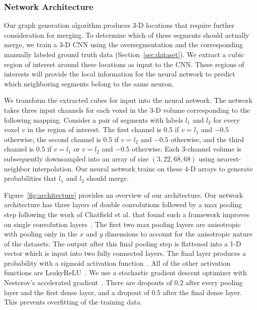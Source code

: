 \subsubsection{Network Architecture}

Our graph generation algorithm produces 3-D locations that require further consideration for merging. 
To determine which of these segments should actually merge, we train a 3-D CNN using the oversegmentation and the corresponding manually labeled ground truth data (Section~\ref{sec:dataset}).
We extract a cubic region of interest around these locations as input to the CNN. 
These regions of interests will provide the local information for the neural network to predict which neighboring segments belong to the same neuron. 

We transform the extracted cubes for input into the neural network. 
The network takes three input channels for each voxel in the 3-D volume corresponding to the following mapping. 
Consider a pair of segments with labels $l_1$ and $l_2$ for every voxel $v$ in the region of interest. 
The first channel is $0.5$ if $v = l_1$ and $-0.5$ otherwise, the second channel is $0.5$ if $v = l_2$ and $-0.5$ otherwise, and the third channel is $0.5$ if $v = l_1$ or $v = l_2$ and $-0.5$ otherwise. 
Each 3-channel volume is subsequently downsampled into an array of size $(3, 22, 68, 68)$ using nearest-neighbor interpolation. 
Our neural network trains on these 4-D arrays to generate probabilities that $l_1$ and $l_2$ should merge.

Figure~\ref{fig:architecture} provides an overview of our architecture. 
Our network architecture has three layers of double convolutions followed by a max pooling step following the work of Chatfield et al. that found such a framework improves on single convolution layers~\cite{chatfield2014return}. The first two max pooling layers are anisotropic with pooling only in the $x$ and $y$ dimensions to account for the anisotropic nature of the datasets.
The output after this final pooling step is flattened into a 1-D vector which is input into two fully connected layers.
The final layer produces a probability with a sigmoid activation function~\cite{funahashi1989approximate}. 
All of the other activation functions are LeakyReLU~\cite{maas2013rectifier}. 
We use a stochastic gradient descent optimizer with Nesterov's accelerated gradient~\cite{nesterov1983method}. 
There are dropouts of $0.2$ after every pooling layer and the first dense layer, and a dropout of $0.5$ after the final dense layer. 
This prevents overfitting of the training data.


